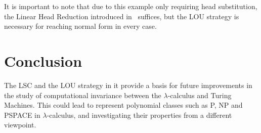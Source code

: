 \message{ !name(VU-CS-BSc-thesis-template.tex)}\documentclass[11pt]{article}
\begin{document}
It is important to note that due to this example only requiring head substitution, the Linear Head Reduction introduced in~\cite{invariance-of-cost-model} suffices, but the LOU strategy is necessary for reaching normal form in every case.

\section{Conclusion}
The LSC and the LOU strategy in it provide a basis for future improvements in the study of computational invariance between the $\lambda$-calculus and Turing Machines. This could lead to represent polynomial classes such as P, NP and PSPACE in $\lambda$-calculus, and investigating their properties from a different viewpoint.
\printbibliography{}
\end{document}
